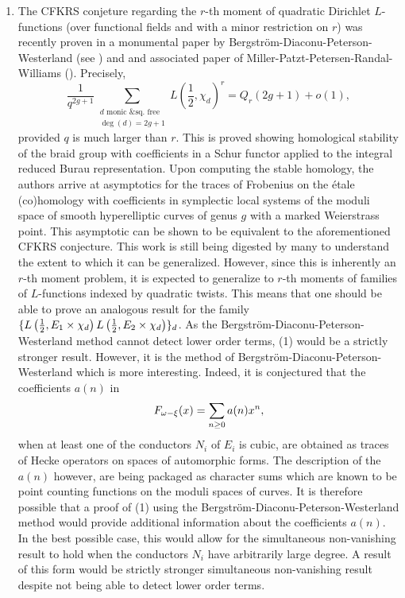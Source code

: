 \documentclass[12pt,reqno,oneside]{amsart}
\begin{document}
\begin{enumerate}
\item The CFKRS conjeture regarding the $r$-th moment of quadratic Dirichlet $L$-functions (over functional fields and with a minor restriction on $r$) was recently proven in a monumental paper by Bergstr\"om-Diaconu-Peterson-Westerland (see \cite{BDPW}) and and associated paper of Miller-Patzt-Petersen-Randal-Williams (\cite{MPPRW}). Precisely,
\[
  \frac{1}{q^{2g+1}}\sum_{\substack{d \text{ monic \& sq. free} \\ \deg(d) = 2g+1}}L\left(\frac{1}{2},\chi_{d}\right)^{r} = Q_{r}(2g+1)+o(1),
\]
provided $q$ is much larger than $r$. This is proved showing homological stability of the braid group with coefficients in a Schur functor applied to the integral reduced Burau representation. Upon computing the stable homology, the authors arrive at asymptotics for the traces of Frobenius on the \'etale (co)homology with coefficients in symplectic local
systems of the moduli space of smooth hyperelliptic curves of genus $g$ with a marked Weierstrass point. This asymptotic can be shown to be equivalent to the aforementioned CFKRS conjecture. This work is still being digested by many to understand the extent to which it can be generalized. However, since this is inherently an $r$-th moment problem, it is expected to generalize to $r$-th moments of families of $L$-functions indexed by quadratic twists. This means that one should be able to prove an analogous result for the family $\{L\left(\frac{1}{2},E_{1} \times \chi_{d}\right)L\left(\frac{1}{2},E_{2} \times \chi_{d}\right)\}_{d}$. As the Bergstr\"om-Diaconu-Peterson-Westerland method cannot detect lower order terms, (1) would be a strictly stronger result. However, it is the method of Bergstr\"om-Diaconu-Peterson-Westerland which is more interesting. Indeed, it is conjectured that the coefficients $a(n)$ in 
\[
  F_{\omega-\xi}(x) = \sum_{n \ge 0}a(n)x^{n},
\]
when at least one of the conductors $N_{i}$ of $E_{i}$ is cubic, are obtained as traces of Hecke operators on spaces of automorphic forms. The description of the $a(n)$ however, are being packaged as character sums which are known to be point counting functions on the moduli spaces of curves. It is therefore possible that a proof of (1) using the Bergstr\"om-Diaconu-Peterson-Westerland method would provide additional information about the coefficients $a(n)$. In the best possible case, this would allow for the simultaneous non-vanishing result to hold when the conductors $N_{i}$ have arbitrarily large degree. A result of this form would be strictly stronger simultaneous non-vanishing result despite not being able to detect lower order terms.
\end{enumerate}
\end{document}
